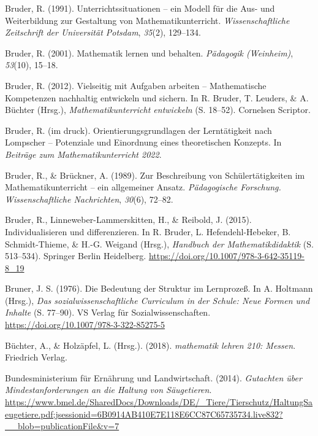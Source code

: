 \documentclass[
]{scrbook}
\newlength{\cslhangindent}
\newlength{\cslentryspacingunit} %
\newenvironment{CSLReferences}[2] %
 {%
  \setlength{\parindent}{0pt}
  \ifodd #1
  \let\oldpar\par
  \def\par{\hangindent=\cslhangindent\oldpar}
  \fi
  \setlength{\parskip}{#2\cslentryspacingunit}
 }%
 {}
\theoremstyle{definition}
\theoremstyle{definition}
\theoremstyle{definition}
\theoremstyle{definition}
\theoremstyle{remark}
\begin{document}
\begin{CSLReferences}{1}{0}
\leavevmode{}%
Bruder, R. (1991). Unterrichtssituationen -- ein {Modell} für die {Aus}- und {Weiterbildung} zur {Gestaltung} von {Mathematikunterricht}. \emph{Wissenschaftliche Zeitschrift der Universität Potsdam}, \emph{35}(2), 129--134.

\leavevmode{}%
Bruder, R. (2001). Mathematik lernen und behalten. \emph{Pädagogik (Weinheim)}, \emph{53}(10), 15--18.

\leavevmode{}%
Bruder, R. (2012). Vielseitig mit {Aufgaben} arbeiten -- {Mathematische} {Kompetenzen} nachhaltig entwickeln und sichern. In R. Bruder, T. Leuders, \& A. Büchter (Hrsg.), \emph{Mathematikunterricht entwickeln} (S. 18--52). Cornelsen Scriptor.

\leavevmode{}%
Bruder, R. (im {d}ruck). Orientierungsgrundlagen der {Lerntätigkeit} nach {Lompscher} -- {Potenziale} und {Einordnung} eines theoretischen {Konzepts}. In \emph{Beiträge zum {Mathematikunterricht} 2022}.

\leavevmode{}%
Bruder, R., \& Brückner, A. (1989). Zur {Beschreibung} von {Schülertätigkeiten} im {Mathematikunterricht} -- ein allgemeiner {Ansatz}. \emph{Pädagogische Forschung. Wissenschaftliche Nachrichten}, \emph{30}(6), 72--82.

\leavevmode{}%
Bruder, R., Linneweber-Lammerskitten, H., \& Reibold, J. (2015). Individualisieren und differenzieren. In R. Bruder, L. Hefendehl-Hebeker, B. Schmidt-Thieme, \& H.-G. Weigand (Hrsg.), \emph{Handbuch der {Mathematikdidaktik}} (S. 513--534). Springer Berlin Heidelberg. \url{https://doi.org/10.1007/978-3-642-35119-8_19}

\leavevmode{}%
Bruner, J. S. (1976). Die {Bedeutung} der {Struktur} im {Lernprozeß}. In A. Holtmann (Hrsg.), \emph{Das sozialwissenschaftliche {Curriculum} in der {Schule}: {Neue} {Formen} und {Inhalte}} (S. 77--90). VS Verlag für Sozialwissenschaften. \url{https://doi.org/10.1007/978-3-322-85275-5}

\leavevmode{}%
Büchter, A., \& Holzäpfel, L. (Hrsg.). (2018). \emph{mathematik lehren 210: Messen}. Friedrich Verlag.

\leavevmode{}%
Bundesministerium für Ernährung und Landwirtschaft. (2014). \emph{Gutachten über {Mindestanforderungen} an die {Haltung} von {Säugetieren}}. \url{https://www.bmel.de/SharedDocs/Downloads/DE/_Tiere/Tierschutz/HaltungSaeugetiere.pdf;jsessionid=6B0914AB410E7E118E6CC87C65735734.live832?__blob=publicationFile\&v=7}


\end{CSLReferences}
\end{document}
